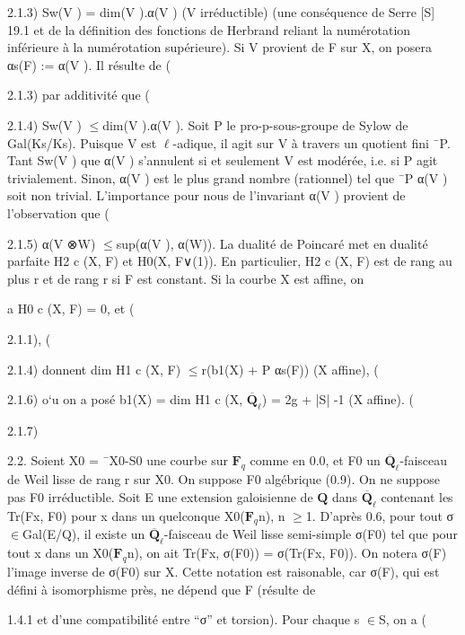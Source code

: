 \documentclass[11pt]{article}
\begin{document}
2.1.3) Sw(V ) = dim(V ).α(V ) (V irréductible) (une conséquence de Serre [S] 19.1 et de la définition des fonctions de Herbrand reliant la numérotation inférieure à la numérotation supérieure). Si V provient de F sur X, on posera αs(F) := α(V ). Il résulte de (

2.1.3) par additivité que (

2.1.4) Sw(V ) \(\le\)dim(V ).α(V ). Soit P le pro-p-sous-groupe de Sylow de Gal(Ks/Ks). Puisque V est \(\ell\)-adique, il agit sur V à travers un quotient fini ¯P. Tant Sw(V ) que α(V ) s’annulent si et seulement V est modérée, i.e. si P agit trivialement. Sinon, α(V ) est le plus grand nombre (rationnel) tel que ¯P α(V ) soit non trivial. L’importance pour nous de l’invariant α(V ) provient de l’observation que (

2.1.5) α(V ⊗W) \(\le\)sup(α(V ), α(W)). La dualité de Poincaré met en dualité parfaite H2 c (X, F) et H0(X, F∨(1)). En particulier, H2 c (X, F) est de rang au plus r et de rang r si F est constant. Si la courbe X est affine, on

a H0 c (X, F) = 0, et (

2.1.1), (

2.1.4) donnent dim H1 c (X, F) \(\le\)r(b1(X) + P αs(F)) (X affine), (

2.1.6) o`u on a posé b1(X) = dim H1 c (X, \(\overline{\mathbf Q}_\ell\)) = 2g + |S| -1 (X affine). (

2.1.7) 

2.2. Soient X0 = ¯X0-S0 une courbe sur \(\mathbf F_q\) comme en 0.0, et F0 un \(\overline{\mathbf Q}_\ell\)-faisceau de Weil lisse de rang r sur X0. On suppose F0 algébrique (0.9). On ne suppose pas F0 irréductible. Soit E une extension galoisienne de \(\mathbf Q\) dans \(\overline{\mathbf Q}_\ell\) contenant les Tr(Fx, F0) pour x dans un quelconque X0(\(\mathbf F_q\)n), n \(\ge\)1. D’après 0.6, pour tout σ \(\in\)Gal(E/Q), il existe un \(\overline{\mathbf Q}_\ell\)-faisceau de Weil lisse semi-simple σ(F0) tel que pour tout x dans un X0(\(\mathbf F_q\)n), on ait Tr(Fx, σ(F0)) = σ(Tr(Fx, F0)). On notera σ(F) l’image inverse de σ(F0) sur X. Cette notation est raisonable, car σ(F), qui est défini à isomorphisme près, ne dépend que F (résulte de 

1.4.1 et d’une compatibilité entre “σ” et torsion). Pour chaque s \(\in\)S, on a (
\end{document}
